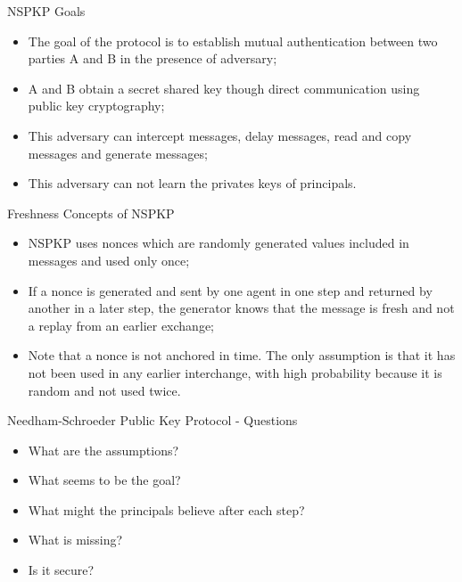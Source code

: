 \documentclass[12pt,table,xcolor={dvipsnames}]{beamer}
\begin{document}
\begin{frame}{NSPKP Goals}
\begin{itemize}
\item The goal of the protocol is to establish mutual authentication between two parties A and B in the presence of adversary;\pause
\item A and B obtain a secret shared key though direct communication using public key cryptography;\pause
\item This adversary can intercept messages, delay messages, read and copy messages and generate messages;\pause
\item This adversary can not learn the privates keys of principals.
\end{itemize}
\end{frame}

\begin{frame}{Freshness Concepts of NSPKP}
\begin{itemize}
\item NSPKP uses nonces which are randomly generated values included in messages and used only once;\pause
\item If a nonce is generated and sent by one agent in one step and returned by another in a later step, the generator knows that the message is fresh and not a replay from an earlier exchange;\pause
\item Note that a nonce is not anchored in time. The only assumption is that it has not been used in any earlier interchange, with high probability because it is random and not used twice.
\end{itemize}
\end{frame}

\begin{frame}{Needham-Schroeder Public Key Protocol - Questions}
\begin{itemize}
\item What are the assumptions? \pause
\item What seems to be the goal?\pause 
\item What might the principals believe after each step?\pause
\item What is missing?\pause
\item Is it secure?
\end{itemize}
\end{frame}
\end{document}
